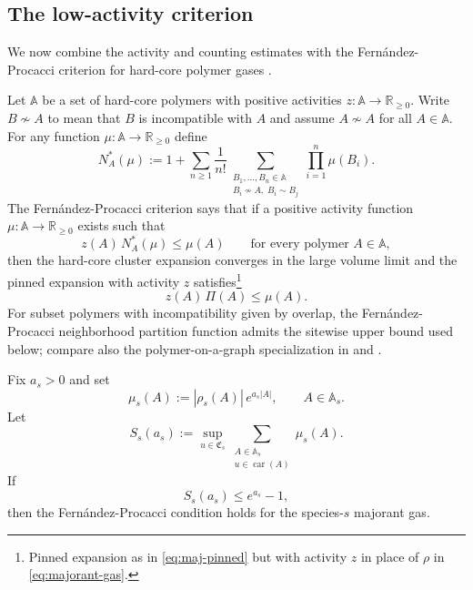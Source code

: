\subsection{The low-activity criterion}
\label{sec:low-activity-criterion}

We now combine the activity and counting estimates with the
Fern\'andez-Procacci criterion for hard-core polymer gases
\cite[Theorem~1]{FernandezProcacci2007}.

Let $\mathbb A$ be a set of hard-core polymers with positive activities $z:\mathbb A \to \mathbb R_{\ge 0}$. Write \(B\nsim A\) to mean
that \(B\) is incompatible with \(A\) and assume $A \nsim A$ for all $A \in \mathbb A$. For any function $\mu:\mathbb A \to \mathbb R_{\ge 0}$ define
\begin{equation}
	N_A^*(\mu)
	:=
	1+
	\sum_{n\ge 1}
	\frac{1}{n!}
	\sum_{\substack{B_1,\dots,B_n \in \mathbb A\\
			B_i\nsim A,\;
			B_i\sim B_j}}
	\prod_{i=1}^n \mu(B_i).
	\label{eq:FP-neighborhood}
\end{equation}
The Fern\'andez-Procacci criterion says that if a positive activity function $\mu:\mathbb A \to \mathbb R_{\ge 0}$ exists
such that
\begin{equation}
	z(A)\,N_A^*(\mu)\le \mu(A)
	\qquad
	\text{for every polymer }A \in \mathbb A,
	\label{eq:FP-criterion}
\end{equation}
then the hard-core cluster expansion converges in the large volume limit and the pinned expansion with activity $z$ satisfies\footnote{Pinned expansion as in \eqref{eq:maj-pinned} but with activity $z$ in place of $\rho$ in \eqref{eq:majorant-gas}.}
\begin{equation}
	z(A)\,\Pi(A)\le \mu(A).
	\label{eq:FP-pinned}
\end{equation}
For subset polymers with incompatibility given by overlap, the
Fern\'andez-Procacci neighborhood partition function admits the sitewise upper bound
used below; compare also the polymer-on-a-graph specialization in
\cite[Section~3.2]{FernandezProcacci2007} and
\cite[Section~2.3 and Proposition~4.1]{BissacotFernandezProcacci2010}.

Fix \(a_s>0\) and set
\begin{equation}
	\mu_s(A)
	:=
	|\rho_s(A)|\,e^{a_s|A|},
	\qquad
	A\in\mathbb A_s.
	\label{eq:mu-choice}
\end{equation}
Let
\begin{equation}
	S_s(a_s)
	:=
	\sup_{u\in\mathfrak C_s}
	\sum_{\substack{A\in\mathbb A_s\\ u\in\operatorname{car}(A)}}
	\mu_s(A).
	\label{eq:sitewise-sum}
\end{equation}
If
\begin{equation}
	S_s(a_s)\le e^{a_s}-1,
	\label{eq:sitewise-FP}
\end{equation}
then the Fern\'andez-Procacci condition holds for the species-\(s\) majorant gas.

